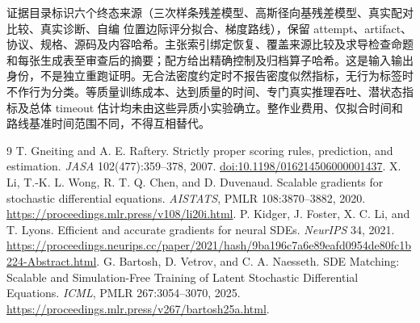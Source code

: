 \documentclass[UTF8,11pt]{ctexart}
\begin{document}
证据目录标识六个终态来源（三次样条残差模型、高斯径向基残差模型、真实配对比较、真实诊断、自编 位置边际评分拟合、梯度路线），保留 attempt、artifact、协议、规格、源码及内容哈希。主张索引绑定恢复、覆盖来源比较及求导检查命题和每张生成表至审查后的摘要；配方给出精确控制及归档算子哈希。这是输入输出身份，不是独立重跑证明。无合法密度约定时不报告密度似然指标，无行为标签时不作行为分类。等质量训练成本、达到质量的时间、专门真实推理吞吐、潜状态指标及总体 timeout 估计均未由这些异质小实验确立。整作业费用、仅拟合时间和路线基准时间范围不同，不得互相替代。

\begin{thebibliography}{9}
 T. Gneiting and A. E. Raftery. Strictly proper scoring rules, prediction, and estimation. \emph{JASA} 102(477):359--378, 2007. \href{https://doi.org/10.1198/016214506000001437}{doi:10.1198/016214506000001437}.
 X. Li, T.-K. L. Wong, R. T. Q. Chen, and D. Duvenaud. Scalable gradients for stochastic differential equations. \emph{AISTATS}, PMLR 108:3870--3882, 2020. \url{https://proceedings.mlr.press/v108/li20i.html}.
 P. Kidger, J. Foster, X. C. Li, and T. Lyons. Efficient and accurate gradients for neural SDEs. \emph{NeurIPS} 34, 2021. \url{https://proceedings.neurips.cc/paper/2021/hash/9ba196c7a6e89eafd0954de80fc1b224-Abstract.html}.
 G. Bartosh, D. Vetrov, and C. A. Naesseth. SDE Matching: Scalable and Simulation-Free Training of Latent Stochastic Differential Equations. \emph{ICML}, PMLR 267:3054--3070, 2025. \url{https://proceedings.mlr.press/v267/bartosh25a.html}.
\end{thebibliography}
\end{document}
